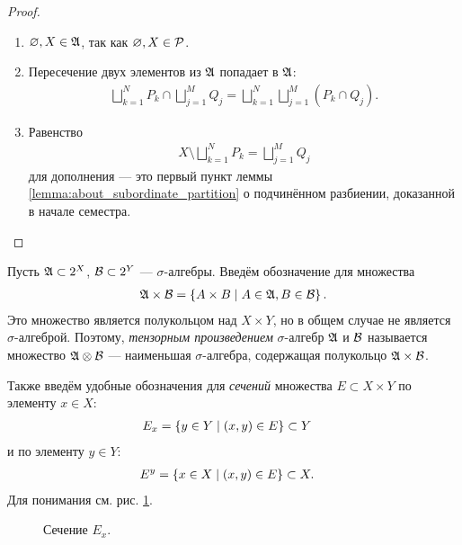 \begin{proof}\
 \begin{enumerate}
  \item $\varnothing, X \in \mathfrak{A}$, так как $\varnothing, X \in \mathcal{P}$.
  \item Пересечение двух элементов из $\mathfrak{A}$ попадает в $\mathfrak{A}$: \begin{align*}
   \bigsqcup_{k=1}^{N} P_k \cap \bigsqcup_{j=1}^{M} Q_j = \bigsqcup_{k=1}^{N} \bigsqcup_{j=1}^{M} (P_k \cap Q_j)
  .\end{align*} 
 \item Равенство \begin{align*}
  X \setminus \bigsqcup_{k=1}^{N} P_k = \bigsqcup_{j=1}^{M} Q_j
 \end{align*} для дополнения --- это первый пункт леммы \ref{lemma:about_subordinate_partition} о подчинённом разбиении, доказанной в начале семестра.
 \end{enumerate}
\end{proof}
\begin{df}
 Пусть $\mathfrak{A} \subset 2^X$, $\mathcal{B} \subset 2^Y$ --- $\sigma$-алгебры. Введём обозначение для множества \begin{align*}
  \mathfrak{A} \times \mathcal{B} = \left\{ A \times B \;\middle|\; A \in \mathfrak{A}, B \in \mathcal{B} \right\}
 .\end{align*} Это множество является полукольцом над $X \times Y$, но в общем случае не является $\sigma$-алгеброй. Поэтому, \textit{тензорным произведением} $\sigma$-алгебр $\mathfrak{A}$ и $\mathcal{B}$ называется множество $\mathfrak{A} \otimes \mathcal{B}$  --- наименьшая $\sigma$-алгебра, содержащая полукольцо $\mathfrak{A} \times \mathcal{B}$.

 Также введём удобные обозначения для \textit{сечений} множества $E \subset X \times Y$ по элементу $x \in X$:
\begin{align*}
 E_x &= \left\{ y \in Y \;\middle|\; (x, y) \in E \right\} \subset Y
\end{align*} и по элементу $y \in Y$:
\begin{align*}
 E^{y} &= \left\{ x \in X \;\middle|\; (x, y) \in E \right\} \subset X
.\end{align*} Для понимания см. рис. \ref{fig:projections}.

\begin{figure}[ht]
    \centering
    \caption{Сечение $E_x$.}
    \label{fig:projections}
\end{figure}

\end{df}

